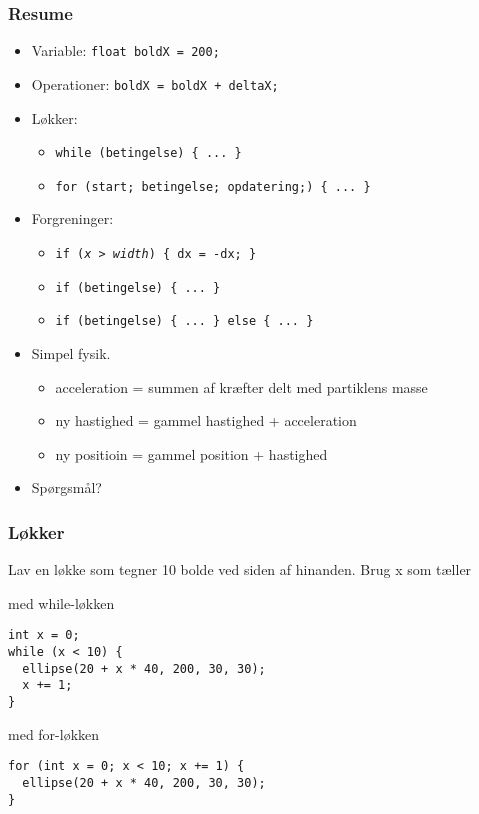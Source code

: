 \documentclass{beamer}
\begin{document}
\begin{frame}[fragile]
  \frametitle{Resume}
  
  \begin{itemize}
  \item Variable: \texttt{float boldX = 200;}\\
  \item Operationer: \texttt{boldX = boldX + deltaX;}\\
  \item Løkker:
    \begin{itemize}
    \item \texttt{while (betingelse) \{ ... \}}\\
    \item \texttt{for (start; betingelse; opdatering;) \{ ... \}}\\
    \end{itemize}
  \item Forgreninger: 
    \begin{itemize}
    \item \texttt{if (\emph{x > width}) \{ dx = -dx; \}}\\
    \item \texttt{if (betingelse) \{ ... \}}\\
    \item \texttt{if (betingelse) \{ ... \} else \{ ... \}}\\
    \end{itemize}
  \item Simpel fysik.
    \begin{itemize}
    \item acceleration = summen af kræfter delt med partiklens masse
    \item ny hastighed = gammel hastighed + acceleration
    \item ny positioin = gammel position + hastighed
    \end{itemize}
  \item Spørgsmål?
  \end{itemize}  
\end{frame}

\begin{frame}[fragile]
  \frametitle{Løkker}

  Lav en løkke som tegner 10 bolde ved siden af hinanden. Brug x som tæller
  \begin{block}{med while-løkken}  
\begin{verbatim}
int x = 0;
while (x < 10) {
  ellipse(20 + x * 40, 200, 30, 30);
  x += 1;
}
\end{verbatim}  
  \end{block}
  
  \begin{block}{med for-løkken}
\begin{verbatim}
for (int x = 0; x < 10; x += 1) {
  ellipse(20 + x * 40, 200, 30, 30);
}
\end{verbatim}  
  \end{block}
    
\end{frame}
\end{document}
